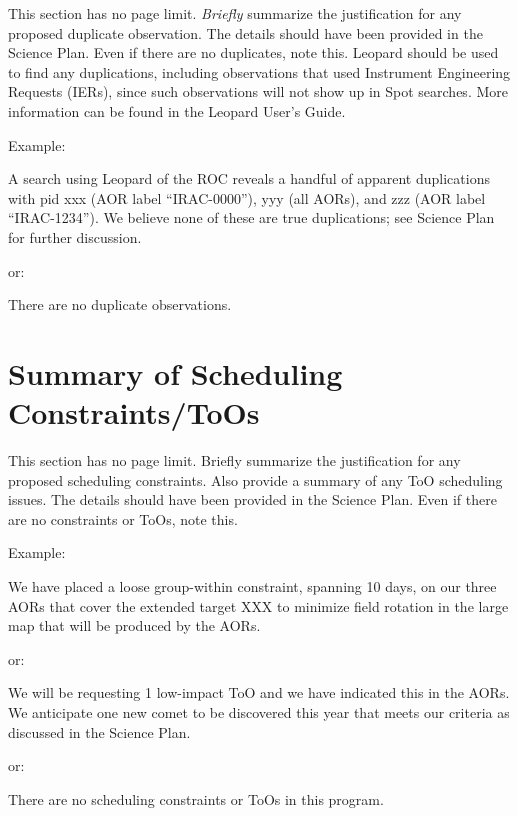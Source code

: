 \documentclass[letterpaper,12pt]{article}
\begin{document}
This section has no page limit. {\it Briefly} summarize the justification for 
any proposed duplicate observation. The details should have been provided in the
Science Plan.  Even if there are no duplicates, note this. Leopard should be 
used to find any duplications, including observations that used Instrument
Engineering Requests (IERs), since such observations will not
show up in Spot searches. More information can be found in the
Leopard User's Guide.\newline

\noindent Example: 

A search using Leopard of the ROC reveals a handful of apparent
duplications with pid xxx (AOR label ``IRAC-0000''), yyy (all
AORs), and zzz (AOR label ``IRAC-1234'').  We believe none of
these are true duplications; see Science Plan for further discussion.  \newline

\noindent or: \newline

\noindent There are no duplicate observations.


\section{Summary of Scheduling Constraints/ToOs}

This section has no page limit. Briefly summarize the justification for 
any proposed scheduling constraints. 
Also provide a summary of any ToO scheduling issues. 
The details should have been provided in the Science Plan. Even if there 
are no constraints or ToOs, note this.\newline

\noindent Example:

We have placed a loose group-within constraint, spanning 10 days,
on our three AORs that cover the extended target XXX to 
minimize field rotation in the large map that will be produced by the AORs.\newline

\noindent or:\noindent 

We will be requesting 1 low-impact ToO and we have indicated this in the 
AORs.  We anticipate one new comet to be discovered this year that meets 
our criteria as discussed in the Science Plan.\newline

\noindent or:

There are no scheduling constraints or ToOs in this program.
\end{document}
